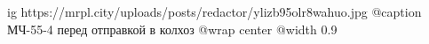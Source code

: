  
 
 
 
 

\ifcmt
  ig https://mrpl.city/uploads/posts/redactor/ylizb95olr8wahuo.jpg
	@caption МЧ-55-4 перед отправкой в колхоз
  @wrap center
  @width 0.9
\fi
